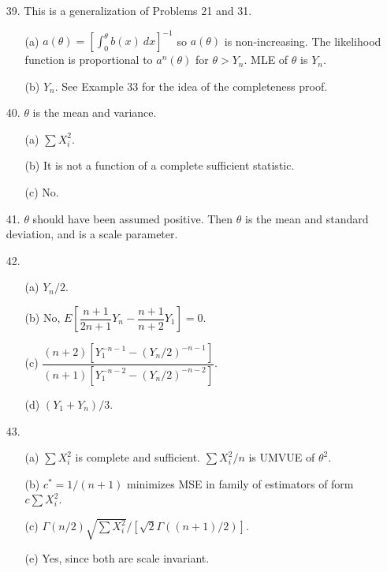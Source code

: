 \begin{enumerate}
	\newpage
	\item[39.] This is a generalization of Problems 21 and 31.
	\begin{enumerate}
		\item[(a)] $a(\theta) = \displaystyle [\int_0^\theta b(x)\ dx]^{-1}$ so $a(\theta)$ is non-increasing.  The likelihood function is proportional to $a^n(\theta)$ for $\theta > Y_n$. MLE of $\theta$ is $Y_n$.
		\item[(b)] $Y_n$. See Example 33 for the idea of the completeness proof.
	\end{enumerate}
	
	\item[40.] $\theta$ is the mean and variance.
	\begin{enumerate}
		\item[(a)] $\sum X_i^2$.
		\item[(b)] It is not a function of a complete sufficient statistic.
		\item[(c)] No.
	\end{enumerate}
	
	\item[41.] $\theta$ should have been assumed positive. Then $\theta$ is the mean and standard deviation, and is a scale parameter.
	
	\item[42.] \begin{enumerate}
		\item[(a)] $Y_n/2$.
		\item[(b)] No, $E[\dfrac{n+1}{2n+1}\!Y_n - \dfrac{n+1}{n+2}\!Y_1] = 0$.
		\item[(c)] $\dfrac{(n+2)[Y^{-n-1}_1 - (Y_n/2)^{-n-1}]}{(n+1)[Y^{-n-2}_1 - (Y_n/2)^{-n-2}]}$.
		\item[(d)] $(Y_1+Y_n)/3$.
	\end{enumerate}
	
	\item[43.] \begin{enumerate}
		\item[(a)] $\sum X_i^2$ is complete and sufficient. $\sum X_i^2/n$ is UMVUE of $\theta^2$.
		\item[(b)] $c^* = 1/(n+1)$ minimizes MSE in family of estimators of form $c\sum X_i^2$.
		\item[(c)] $\Gamma(n/2)\sqrt{\sum X_i^2}/[\sqrt{2}\Gamma((n+1)/2)]$.
		\item[(e)] Yes, since both are scale invariant.
	\end{enumerate}	 
	

\end{enumerate}
